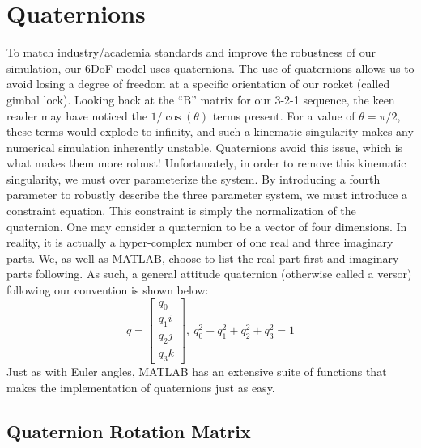 \documentclass[10pt, openany, titlepage]{book}
\theoremstyle{definition}
\begin{document}
\section{Quaternions}\label{sec:quaternions}

To match industry/academia standards and improve the robustness of our simulation, our 6DoF model uses \glspl{quaternion}. The use of quaternions allows us to avoid losing a degree of freedom at a specific orientation of our rocket (called gimbal lock). Looking back at the ``B'' matrix for our 3-2-1 sequence, the keen reader may have noticed the $1/\cos(\theta)$ terms present. For a value of $\theta=\pi/2$, these terms would explode to infinity, and such a kinematic singularity makes any numerical simulation inherently unstable. Quaternions avoid this issue, which is what makes them more robust! Unfortunately, in order to remove this kinematic singularity, we must over parameterize the system. By introducing a fourth parameter to robustly describe the three parameter system, we must introduce a constraint equation. This constraint is simply the normalization of the quaternion. One may consider a quaternion to be a vector of four dimensions. In reality, it is actually a hyper-complex number of one real and three imaginary parts. We, as well as MATLAB, choose to list the real part first and imaginary parts following. As such, a general attitude quaternion (otherwise called a versor) following our convention is shown below:
\begin{equation}
    q=\begin{bmatrix}
        q_0\\q_1i\\q_2j\\q_3k
    \end{bmatrix},\ q_0^2+q_1^2+q_2^2+q_3^2=1
\end{equation}
Just as with \gls{Euler angles}, MATLAB has an extensive suite of functions that makes the implementation of \glspl{quaternion} just as easy. 

\subsection{Quaternion Rotation Matrix}
\end{document}
